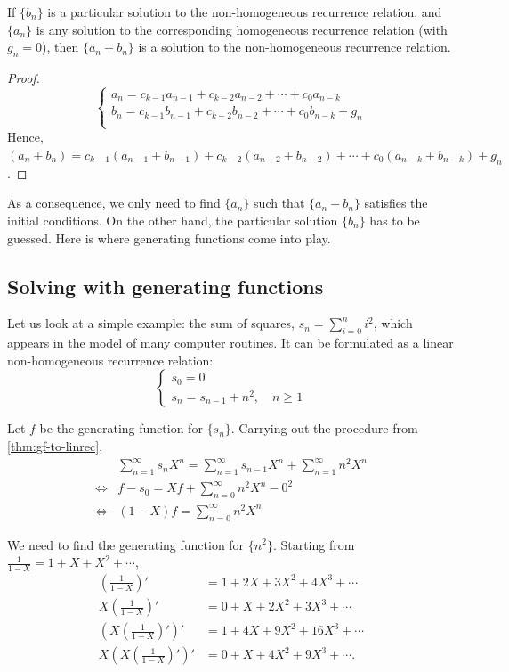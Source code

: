 \documentclass[a4paper, 12pt]{report}
\begin{document}
\begin{prop}
If $\{b_n\}$ is a particular solution to the non-homogeneous recurrence relation, and $\{a_n\}$ is any solution to the corresponding homogeneous recurrence relation (with $g_n = 0$), then $\{a_n + b_n\}$ is a solution to the non-homogeneous recurrence relation.
\end{prop}

\begin{proof}
\[\begin{cases}
    a_n = c_{k - 1}a_{n - 1} + c_{k - 2}a_{n - 2} + \cdots + c_0 a_{n - k} \\
    b_n = c_{k - 1}b_{n - 1} + c_{k - 2}b_{n - 2} + \cdots + c_0 b_{n - k} + g_n\\
    \end{cases}
\]
Hence, $(a_n + b_n) = c_{k - 1}(a_{n - 1} + b_{n - 1}) + c_{k - 2}(a_{n - 2} + b_{n - 2}) + \cdots + c_0 (a_{n - k} + b_{n - k}) + g_n$.
\end{proof}
As a consequence, we only need to find $\{a_n\}$ such that $\{a_n + b_n\}$ satisfies the initial conditions. On the other hand, the particular solution $\{b_n\}$ has to be guessed. Here is where generating functions come into play.

\subsection{Solving with generating functions}
Let us look at a simple example: the sum of squares, $s_n = \sum_{i = 0}^n i^2$, which appears in the model of many computer routines. It can be formulated as a linear non-homogeneous recurrence relation:
\[
\begin{cases}
s_0 = 0\\
s_n = s_{n - 1} + n^2, \quad n \geq 1
\end{cases}
\]

Let $f$ be the generating function for $\{s_n\}$. Carrying out the procedure from \cref{thm:gf-to-linrec},
\begin{align*}
&\sum_{n = 1}^\infty s_n X^n = \sum_{n = 1}^\infty s_{n - 1}X^n + \sum_{n = 1}^\infty n^2 X^n\\
\iff &f - s_0 = X f + \sum_{n = 0}^\infty n^2 X^n - 0^2\\
\iff &(1 - X)f = \sum_{n = 0}^\infty n^2 X^n
\end{align*}

We need to find the generating function for $\{n^2\}$. Starting from $\frac{1}{1 - X} = 1 + X + X^2 + \cdots$,
\begin{align*}
    \left(\frac{1}{1 - X}\right)' &= 1 + 2X + 3X^2 + 4X^3 + \cdots\\
    X \left(\frac{1}{1 - X}\right)' &= 0 + X + 2X^2 + 3 X^3 + \cdots\\
    \left(X \left(\frac{1}{1 - X}\right)'\right)' &= 1 + 4X + 9X^2 + 16X^3 + \cdots\\
    X \left(X \left(\frac{1}{1 - X}\right)'\right)' &= 0 + X + 4X^2 + 9 X^3 + \cdots.
\end{align*}
\end{document}
